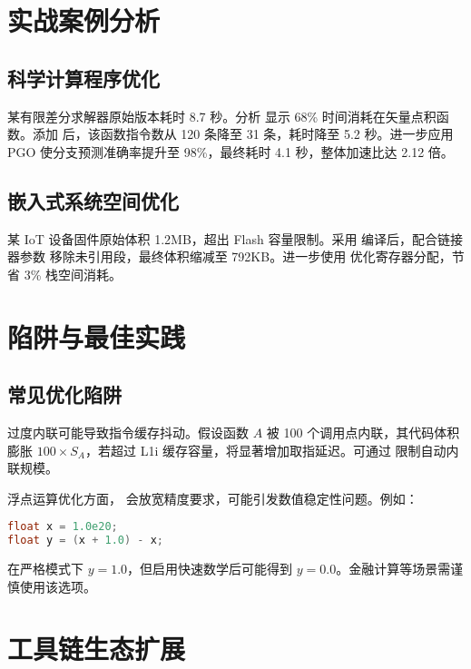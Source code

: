 \chapter{实战案例分析}
\section{科学计算程序优化}
某有限差分求解器原始版本耗时 8.7 秒。分析  显示 68\%{} 时间消耗在矢量点积函数。添加  后，该函数指令数从 120 条降至 31 条，耗时降至 5.2 秒。进一步应用 PGO 使分支预测准确率提升至 98\%{}，最终耗时 4.1 秒，整体加速比达 2.12 倍。\par
\section{嵌入式系统空间优化}
某 IoT 设备固件原始体积 1.2MB，超出 Flash 容量限制。采用  编译后，配合链接器参数  移除未引用段，最终体积缩减至 792KB。进一步使用  优化寄存器分配，节省 3\%{} 栈空间消耗。\par
\chapter{陷阱与最佳实践}
\section{常见优化陷阱}
过度内联可能导致指令缓存抖动。假设函数 $A$ 被 100 个调用点内联，其代码体积膨胀 $100 \times S_A$，若超过 L1i 缓存容量，将显著增加取指延迟。可通过  限制自动内联规模。\par
浮点运算优化方面， 会放宽精度要求，可能引发数值稳定性问题。例如：\par
\begin{lstlisting}[language=c]
float x = 1.0e20;
float y = (x + 1.0) - x;
\end{lstlisting}
在严格模式下 $y=1.0$，但启用快速数学后可能得到 $y=0.0$。金融计算等场景需谨慎使用该选项。\par
\chapter{工具链生态扩展}
